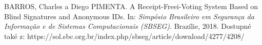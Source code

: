 \begin{thebibliography}{1}

BARROS, Charles a Diego PIMENTA. A Receipt-Freei-Voting System Based on Blind Signatures and Anonymous IDs. In: \textit{Simpósio Brasileiro em Segurança da Informação e de Sistemas Computacionais (SBSEG)}. Brazílie, 2018. Dostupné také z: https://sol.sbc.org.br/index.php/sbseg/article/download/4277/4208/

\end{thebibliography}